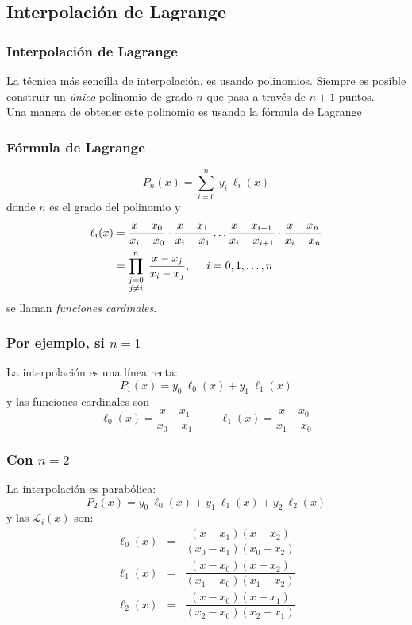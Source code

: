 \subsection{Interpolación de Lagrange}
\begin{frame}
\frametitle{Interpolación de Lagrange}
La técnica más sencilla de interpolación, es usando polinomios. Siempre es posible construir un \emph{único} polinomio de grado $n$ que pasa a través de $n + 1$ puntos.
\\
\medskip
Una manera de obtener este polinomio es usando la fórmula de Lagrange
\end{frame}
\begin{frame}
\frametitle{Fórmula de Lagrange}
\begin{equation}
P_{n}(x) = \sum_{i = 0}^{n} \: y_{i} \: \ell_{i}(x)
\label{eq:ecuacion_03_01a}
\end{equation}
donde $n$ es el grado del polinomio y
\begin{align}
\begin{aligned}
\ell_{i}(x) &= \dfrac{x - x_{0}}{x_{i} - x_{0}} \cdot \dfrac{x - x_{1}}{x_{i} - x_{1}} \ldots \dfrac{x - x_{i + 1}}{x_{i} - x_{i + 1}} \cdot \dfrac{x - x_{n}}{x_{i} - x_{n}} \\
 &= \prod_{\substack{j = 0 \\ j \neq i}}^{n} \; \dfrac{x - x_{j}}{x_{i} - x_{j}}, \hspace{0.5cm} i = 0,1,\ldots,n
\end{aligned}
\label{eq:ecuacion_03_01b}
\end{align}
se llaman \emph{funciones cardinales}.
\end{frame}
\begin{frame}
\frametitle{Por ejemplo, si $n = 1$}
La interpolación es una línea recta: 
\[P_{1}(x) = y_{0} \: \ell_{0}(x) + y_{1} \: \ell_{1}(x) \]
y las funciones cardinales son
\[ \ell_{0}(x) = \dfrac{x - x_{1}}{x_{0} - x_{1}} \hspace{1cm} \ell_{1}(x) = \dfrac{x - x_{0}}{x_{1} - x_{0}} \]
\end{frame}
\begin{frame}
\frametitle{Con $n = 2$}
La interpolación es parabólica:
\[P_{2}(x) = y_{0} \: \ell_{0}(x) + y_{1} \: \ell_{1}(x) + y_{2} \: \ell_{2}(x) \]
y las $\mathcal{L}_{i}(x)$ son:
\begin{eqnarray*}
\ell_{0}(x) &=& \dfrac{(x - x_{1})(x - x_{2})}{(x_{0} - x_{1})(x_{0} - x_{2})} \\
\ell_{1}(x) &=& \dfrac{(x - x_{0})(x - x_{2})}{(x_{1} - x_{0})(x_{1} - x_{2})} \\
\ell_{2}(x) &=& \dfrac{(x - x_{0})(x - x_{1})}{(x_{2} - x_{0})(x_{2} - x_{1})} 
\end{eqnarray*}
\end{frame}
